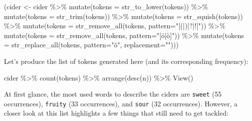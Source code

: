 \documentclass[
]{book}
\newenvironment{Shaded}{\begin{snugshade}}{\end{snugshade}}
\newcommand{\AttributeTok}[1]{\textcolor[rgb]{0.77,0.63,0.00}{#1}}
\newcommand{\FunctionTok}[1]{\textcolor[rgb]{0.00,0.00,0.00}{#1}}
\newcommand{\NormalTok}[1]{#1}
\newcommand{\OtherTok}[1]{\textcolor[rgb]{0.56,0.35,0.01}{#1}}
\newcommand{\SpecialCharTok}[1]{\textcolor[rgb]{0.00,0.00,0.00}{#1}}
\newcommand{\StringTok}[1]{\textcolor[rgb]{0.31,0.60,0.02}{#1}}
\begin{document}
\begin{Shaded}
\begin{Highlighting}[]
\NormalTok{(cider }\OtherTok{\textless{}{-}}\NormalTok{ cider }\SpecialCharTok{\%\textgreater{}\%} 
  \FunctionTok{mutate}\NormalTok{(}\AttributeTok{tokens =} \FunctionTok{str\_to\_lower}\NormalTok{(tokens)) }\SpecialCharTok{\%\textgreater{}\%} 
  \FunctionTok{mutate}\NormalTok{(}\AttributeTok{tokens =} \FunctionTok{str\_trim}\NormalTok{(tokens)) }\SpecialCharTok{\%\textgreater{}\%} 
  \FunctionTok{mutate}\NormalTok{(}\AttributeTok{tokens =} \FunctionTok{str\_squish}\NormalTok{(tokens)) }\SpecialCharTok{\%\textgreater{}\%} 
  \FunctionTok{mutate}\NormalTok{(}\AttributeTok{tokens =} \FunctionTok{str\_remove\_all}\NormalTok{(tokens, }\AttributeTok{pattern=}\StringTok{"[(|)|?|!]"}\NormalTok{)) }\SpecialCharTok{\%\textgreater{}\%} 
  \FunctionTok{mutate}\NormalTok{(}\AttributeTok{tokens =} \FunctionTok{str\_remove\_all}\NormalTok{(tokens, }\AttributeTok{pattern=}\StringTok{"[ó|ò]"}\NormalTok{)) }\SpecialCharTok{\%\textgreater{}\%} 
  \FunctionTok{mutate}\NormalTok{(}\AttributeTok{tokens =} \FunctionTok{str\_replace\_all}\NormalTok{(tokens, }\AttributeTok{pattern=}\StringTok{"õ"}\NormalTok{, }\AttributeTok{replacement=}\StringTok{"\textquotesingle{}"}\NormalTok{)))}
\end{Highlighting}
\end{Shaded}

Let's produce the list of tokens generated here (and its corresponding frequency):

\begin{Shaded}
\begin{Highlighting}[]
\NormalTok{cider }\SpecialCharTok{\%\textgreater{}\%} 
  \FunctionTok{count}\NormalTok{(tokens) }\SpecialCharTok{\%\textgreater{}\%} 
  \FunctionTok{arrange}\NormalTok{(}\FunctionTok{desc}\NormalTok{(n)) }\SpecialCharTok{\%\textgreater{}\%}
  \FunctionTok{View}\NormalTok{()}
\end{Highlighting}
\end{Shaded}

At first glance, the most used words to describe the ciders are \texttt{sweet} (55 occurrences), \texttt{fruity} (33 occurrences), and \texttt{sour} (32 occurrences). However, a closer look at this list highlights a few things that still need to get tackled:
\end{document}
